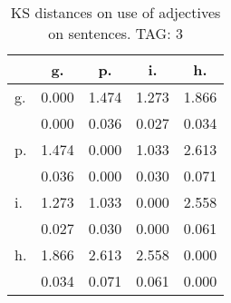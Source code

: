\begin{table}[h!]
\begin{center}
\begin{tabular}{| l | c | c | c | c |}\hline
 & g. & p. & i. & h. \\\hline
g. & 0.000  & 1.474  & 1.273  & 1.866 \\\hline
 & 0.000  & 0.036  & 0.027  & 0.034 \\\hline
p. & 1.474  & 0.000  & 1.033  & 2.613 \\\hline
 & 0.036  & 0.000  & 0.030  & 0.071 \\\hline
i. & 1.273  & 1.033  & 0.000  & 2.558 \\\hline
 & 0.027  & 0.030  & 0.000  & 0.061 \\\hline
h. & 1.866  & 2.613  & 2.558  & 0.000 \\\hline
 & 0.034  & 0.071  & 0.061  & 0.000 \\\hline
\end{tabular}
\caption{KS distances on use of adjectives on sentences. TAG: 3}
\end{center}
\end{table}